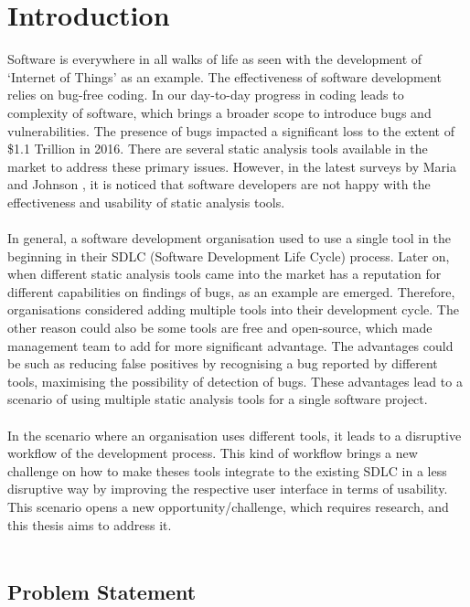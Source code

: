 \chapter{Introduction}
\label{ch:introduction_report}

Software is everywhere in all walks of life as seen with the development of ‘Internet of Things’ as an example. The effectiveness of software development relies on bug-free coding. In our day-to-day progress in coding leads to complexity of software, which brings a broader scope to introduce bugs and vulnerabilities. The presence of bugs impacted a significant loss to the extent of \$1.1 Trillion in 2016. \cite{report} There are several static analysis tools available in the market to address these primary issues. However, in the latest surveys by Maria \etal{} \cite{CB16} and Johnson \etal{} \cite{JSMB13}, it is noticed that software developers are not happy with the effectiveness and usability of static analysis tools.
\\ \\

In general, a software development organisation used to use a single tool in the beginning in their SDLC (Software Development Life Cycle) process. Later on, when different static analysis tools came into the market has a reputation for different capabilities on findings of bugs, as an example are emerged. Therefore, organisations considered adding multiple tools into their development cycle. The other reason could also be some tools are free and open-source, which made management team to add for more significant advantage. The advantages could be such as reducing false positives by recognising a bug reported by different tools, maximising the possibility of detection of bugs. These advantages lead to a scenario of using multiple static analysis tools for a single software project.
\\ \\

In the scenario where an organisation uses different tools, it leads to a disruptive workflow of the development process. This kind of workflow brings a new challenge on how to make theses tools integrate to the existing SDLC in a less disruptive way by improving the respective user interface in terms of usability. This scenario opens a new opportunity/challenge, which requires research, and this thesis aims to address it.
\\ \\

\section{Problem Statement}

